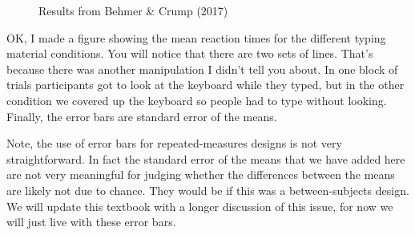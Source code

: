 \documentclass[
  letterpaper,
  DIV=11,
  numbers=noendperiod]{scrreprt}
\begin{document}
\begin{figure}


\caption{\label{fig-9behmcrump}Results from Behmer \& Crump (2017)}

\end{figure}%

OK, I made a figure showing the mean reaction times for the different
typing material conditions. You will notice that there are two sets of
lines. That's because there was another manipulation I didn't tell you
about. In one block of trials participants got to look at the keyboard
while they typed, but in the other condition we covered up the keyboard
so people had to type without looking. Finally, the error bars are
standard error of the means.

\begin{tcolorbox}[enhanced jigsaw, title=\textcolor{quarto-callout-note-color}{\faInfo}\hspace{0.5em}{Note}, colframe=quarto-callout-note-color-frame, colbacktitle=quarto-callout-note-color!10!white, bottomtitle=1mm, leftrule=.75mm, rightrule=.15mm, titlerule=0mm, arc=.35mm, colback=white, opacitybacktitle=0.6, toprule=.15mm, toptitle=1mm, bottomrule=.15mm, coltitle=black, breakable, left=2mm, opacityback=0]

Note, the use of error bars for repeated-measures designs is not very
straightforward. In fact the standard error of the means that we have
added here are not very meaningful for judging whether the differences
between the means are likely not due to chance. They would be if this
was a between-subjects design. We will update this textbook with a
longer discussion of this issue, for now we will just live with these
error bars.

\end{tcolorbox}
\end{document}
